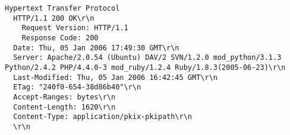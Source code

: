 \begin{lstlisting}[caption={Início (cabeçalho) da resposta HTTP enviada pelo servidor para a aplicação \texttt{s\_server}}]
Hypertext Transfer Protocol
  HTTP/1.1 200 OK\r\n
    Request Version: HTTP/1.1
    Response Code: 200
  Date: Thu, 05 Jan 2006 17:49:30 GMT\r\n
  Server: Apache/2.0.54 (Ubuntu) DAV/2 SVN/1.2.0 mod_python/3.1.3 Python/2.4.2 PHP/4.4.0-3 mod_ruby/1.2.4 Ruby/1.8.3(2005-06-23)\r\n
  Last-Modified: Thu, 05 Jan 2006 16:42:45 GMT\r\n
  ETag: "240f0-654-38d86b40"\r\n
  Accept-Ranges: bytes\r\n
  Content-Length: 1620\r\n
  Content-Type: application/pkix-pkipath\r\n
  \r\n
\end{lstlisting}

